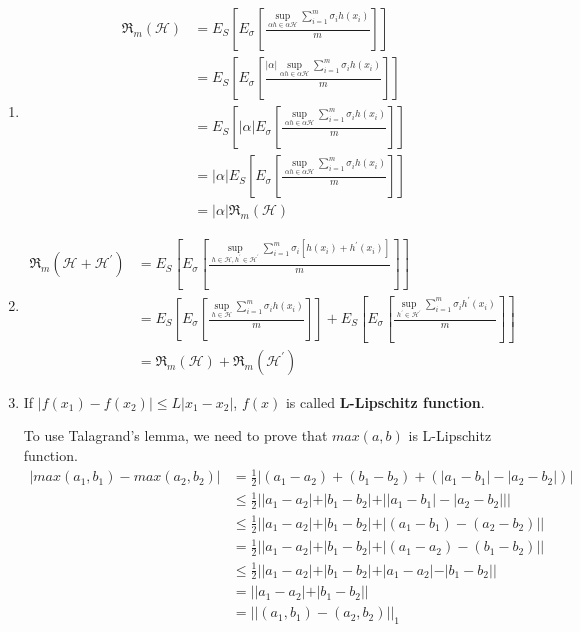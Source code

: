 \documentclass[12pt]{article}
\begin{document}
\begin{enumerate}[label=(\alph*), left=0pt]
    \item 
    \begin{align*}
        \mathfrak{R}_{m}(\mathcal{H}) &= E_{S}[E_{\sigma}[\frac{\sup \limits_{\alpha h \in \alpha\mathcal{H}}
            \sum \limits_{i=1}^{m} \sigma_{i} h(x_{i})}{m}]] \\
        &= E_{S}[E_{\sigma}[\frac{|\alpha| \sup \limits_{\alpha h \in \alpha\mathcal{H}}
            \sum \limits_{i=1}^{m} \sigma_{i} h(x_{i})}{m}]] \\
        &= E_{S}[|\alpha| E_{\sigma}[\frac{\sup \limits_{\alpha h \in \alpha\mathcal{H}}
            \sum \limits_{i=1}^{m} \sigma_{i} h(x_{i})}{m}]] \\
        &= |\alpha| E_{S}[E_{\sigma}[\frac{\sup \limits_{\alpha h \in \alpha\mathcal{H}}
            \sum \limits_{i=1}^{m} \sigma_{i} h(x_{i})}{m}]] \\
        &= |\alpha| \mathfrak{R}_{m}(\mathcal{H})
    \end{align*}

    \item 
    \begin{align*}
        \mathfrak{R}_{m}(\mathcal{H} + \mathcal{H}^{'}) &= E_{S}[E_{\sigma}[\frac{\sup \limits_{h \in \mathcal{H},
        h^{'} \in \mathcal{H}^{'}} \sum \limits_{i=1}^{m} \sigma_{i} [h(x_{i}) + h^{'}(x_{i})]}{m}]] \\
        &= E_{S}[E_{\sigma}[\frac{\sup \limits_{h \in \mathcal{H}}\sum \limits_{i=1}^{m} \sigma_{i} h(x_{i})}{m}]] 
        + E_{S}[E_{\sigma}[\frac{\sup \limits_{h^{'} \in \mathcal{H^{'}}} \sum \limits_{i=1}^{m} \sigma_{i} h^{'}(x_{i})}{m}]] \\
        &= \mathfrak{R}_{m}(\mathcal{H}) + \mathfrak{R}_{m}(\mathcal{H}^{'})
    \end{align*}

    \item 
    If $|f(x_{1}) - f(x_{2})| \le L |x_{1} - x_{2}|$, $f(x)$ is called \textbf{L-Lipschitz function}.

    To use Talagrand's lemma, we need to prove that $max(a, b)$ is L-Lipschitz function. 
    \begin{align*}
        |max(a_{1}, b_{1}) - max(a_{2}, b_{2})| &= \frac{1}{2} |(a_{1} - a_{2}) + (b_{1} - b_{2}) + 
        (|a_{1} - b_{1}| - |a_{2} - b_{2}|)| \\
        &\le \frac{1}{2} ||a_{1} - a_{2}| + |b_{1} - b_{2}| + ||a_{1} - b_{1}| - |a_{2} - b_{2}||| \\
        &\le \frac{1}{2} ||a_{1} - a_{2}| + |b_{1} - b_{2}| + |(a_{1} - b_{1}) - (a_{2} - b_{2})|| \\
        &= \frac{1}{2} ||a_{1} - a_{2}| + |b_{1} - b_{2}| + |(a_{1} - a_{2}) - (b_{1} - b_{2})|| \\
        &\le \frac{1}{2} ||a_{1} - a_{2}| + |b_{1} - b_{2}| + |a_{1} - a_{2}| - |b_{1} - b_{2}|| \\
        &= ||a_{1} - a_{2}| + |b_{1} - b_{2}|| \\
        &= ||(a_{1}, b_{1}) - (a_{2}, b_{2})|| _{1}
    \end{align*}


\end{enumerate}
\end{document}
